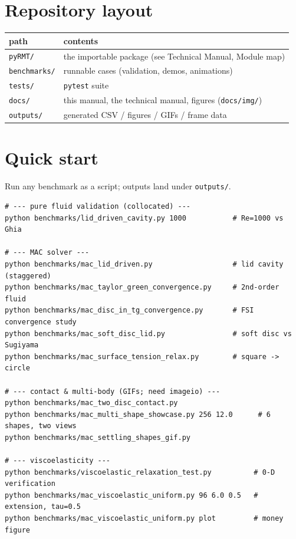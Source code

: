 \documentclass[11pt]{article}
\begin{document}
\section{Repository layout}
\begin{center}
\begin{tabular}{ll}
\toprule
path & contents \\
\midrule
\texttt{pyRMT/} & the importable package (see Technical Manual, Module map) \\
\texttt{benchmarks/} & runnable cases (validation, demos, animations) \\
\texttt{tests/} & \texttt{pytest} suite \\
\texttt{docs/} & this manual, the technical manual, figures (\texttt{docs/img/}) \\
\texttt{outputs/} & generated CSV / figures / GIFs / frame data \\
\bottomrule
\end{tabular}
\end{center}

\section{Quick start}
Run any benchmark as a script; outputs land under \texttt{outputs/}.
\begin{lstlisting}[style=sh]
# --- pure fluid validation (collocated) ---
python benchmarks/lid_driven_cavity.py 1000           # Re=1000 vs Ghia

# --- MAC solver ---
python benchmarks/mac_lid_driven.py                   # lid cavity (staggered)
python benchmarks/mac_taylor_green_convergence.py     # 2nd-order fluid
python benchmarks/mac_disc_in_tg_convergence.py       # FSI convergence study
python benchmarks/mac_soft_disc_lid.py                # soft disc vs Sugiyama
python benchmarks/mac_surface_tension_relax.py        # square -> circle

# --- contact & multi-body (GIFs; need imageio) ---
python benchmarks/mac_two_disc_contact.py
python benchmarks/mac_multi_shape_showcase.py 256 12.0      # 6 shapes, two views
python benchmarks/mac_settling_shapes_gif.py

# --- viscoelasticity ---
python benchmarks/viscoelastic_relaxation_test.py          # 0-D verification
python benchmarks/mac_viscoelastic_uniform.py 96 6.0 0.5   # extension, tau=0.5
python benchmarks/mac_viscoelastic_uniform.py plot         # money figure
\end{lstlisting}
\end{document}

